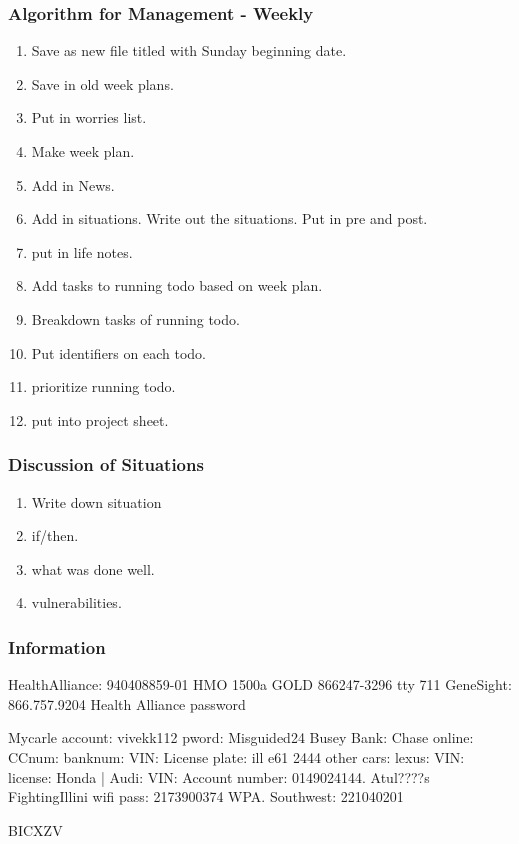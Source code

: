 \begin{frame}
\frametitle{Algorithm for Management - Weekly} 
\begin{enumerate}
\tiny \item \tiny Save as new file titled with Sunday beginning date. 
\item \tiny Save in old week plans. 
\item \tiny Put in worries list. 
\item \tiny Make week plan. 
\item \tiny Add in News. 
\item \tiny Add in situations. Write out the situations.  Put in pre
  and post. 
\item \tiny put in life notes. 
\item \tiny Add tasks to running todo based on week plan.
\item \tiny Breakdown tasks of running todo. 
\item \tiny Put identifiers on each todo. 
\item \tiny prioritize running todo. 
\item \tiny put into project sheet.  
\end{enumerate}
\end{frame} 

\begin{frame}[label=algsituationexp] 
\frametitle{Discussion of Situations} 
\begin{enumerate} 
\tiny \item \tiny Write down situation 
\item \tiny if/then. 
\item \tiny what was done well. 
\item \tiny vulnerabilities. 
\end{enumerate} 
\end{frame} 




\begin{frame} 
\frametitle{ Information}  
HealthAlliance:   940408859-01 HMO 1500a GOLD 866247-3296 tty 711
GeneSight: 866.757.9204  
Health Alliance password

Mycarle account: vivekk112 pword:  Misguided24
Busey Bank: 
Chase online:
CCnum:  banknum:  
VIN:  License plate: ill e61 2444   other cars: lexus:  VIN:  license:
Honda  |  Audi: VIN: 
Account number: 0149024144.
Atul????s FightingIllini  wifi pass:  2173900374 WPA. 
Southwest: 221040201

BICXZV 

\end{frame}

